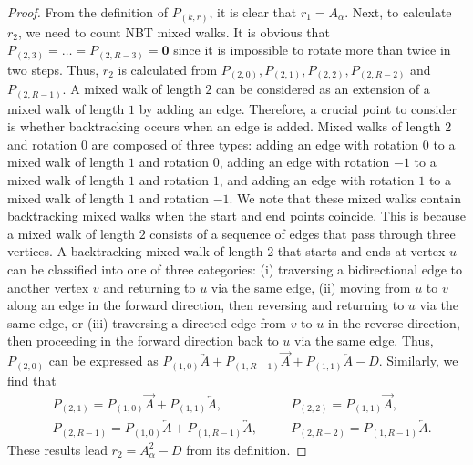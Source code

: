 \documentclass{article}
\theoremstyle{plain}
\begin{document}
\begin{proof}
	From the definition of $P_{(k,r)}$, it is clear that $r_1 = A_{\alpha}$.
	Next, to calculate $r_2$, we need to count NBT mixed walks.
	It is obvious that $P_{(2,3)} = \dots = P_{(2,R-3)} = \bm{0}$ since it is impossible to rotate more than twice in two steps.
	Thus, $r_2$ is calculated from $P_{(2,0)}, P_{(2,1)}, P_{(2,2)}, P_{(2,R-2)}$ and $P_{(2,R-1)}$.
	A mixed walk of length $2$ can be considered as an extension of a mixed walk of length $1$ by adding an edge.
	Therefore, a crucial point to consider is whether backtracking occurs when an edge is added.
	Mixed walks of length $2$ and rotation $0$ are composed of three types: adding an edge with rotation $0$ to a mixed walk of length $1$ and rotation $0$, adding an edge with rotation $-1$ to a mixed walk of length $1$ and rotation $1$, and adding an edge with rotation $1$ to a mixed walk of length $1$ and rotation $-1$.
	We note that these mixed walks contain backtracking mixed walks when the start and end points coincide.
	This is because a mixed walk of length $2$ consists of a sequence of edges that pass through three vertices.
	A backtracking mixed walk of length $2$ that starts and ends at vertex $u$ can be classified into one of three categories: (i) traversing a bidirectional edge to another vertex $v$ and returning to $u$ via the same edge, (ii) moving from $u$ to $v$ along an edge in the forward direction, then reversing and returning to $u$ via the same edge, or (iii) traversing a directed edge from $v$ to $u$ in the reverse direction, then proceeding in the forward direction back to $u$ via the same edge. Thus, $P_{(2,0)}$ can be expressed as $P_{(1,0)} \overleftrightarrow{A} + P_{(1,R-1)} \overrightarrow{A} + P_{(1,1)} \overleftarrow{A} - D$.
	Similarly, we find that
	\begin{align*}
		  & P_{(2,1)} =
		P_{(1,0)} \overrightarrow{A}
		+ P_{(1,1)} \overleftrightarrow{A}
		, & \quad
		  & P_{(2,2)} =
		P_{(1,1)} \overrightarrow{A}
		,                 \\
		  & P_{(2,R-1)} =
		P_{(1,0)} \overleftarrow{A}
		+ P_{(1,R-1)} \overleftrightarrow{A}
		, & \quad
		  & P_{(2,R-2)} =
		P_{(1,R-1)} \overleftarrow{A}
		.
	\end{align*}
	These results lead $r_2 = A_{\alpha}^2 - D$ from its definition.


\end{proof}
\end{document}
